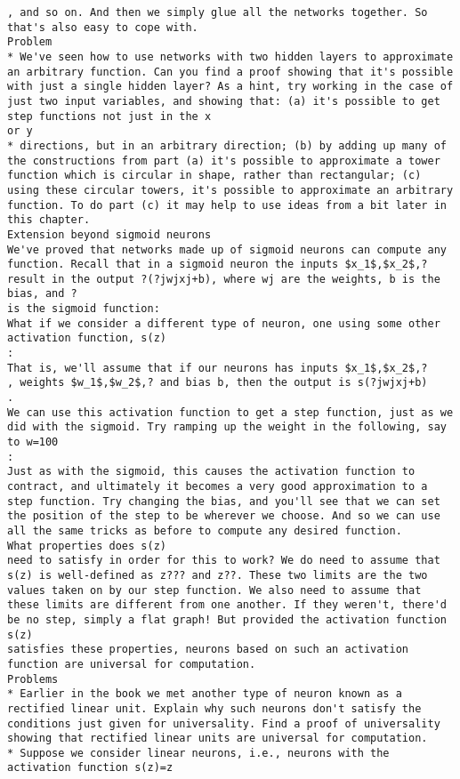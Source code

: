 \begin{lstlisting}
, and so on. And then we simply glue all the networks together. So that's also easy to cope with.
Problem
* We've seen how to use networks with two hidden layers to approximate an arbitrary function. Can you find a proof showing that it's possible with just a single hidden layer? As a hint, try working in the case of just two input variables, and showing that: (a) it's possible to get step functions not just in the x
or y
* directions, but in an arbitrary direction; (b) by adding up many of the constructions from part (a) it's possible to approximate a tower function which is circular in shape, rather than rectangular; (c) using these circular towers, it's possible to approximate an arbitrary function. To do part (c) it may help to use ideas from a bit later in this chapter.
Extension beyond sigmoid neurons
We've proved that networks made up of sigmoid neurons can compute any function. Recall that in a sigmoid neuron the inputs $x_1$,$x_2$,?
result in the output ?(?jwjxj+b), where wj are the weights, b is the bias, and ?
is the sigmoid function:
What if we consider a different type of neuron, one using some other activation function, s(z)
:
That is, we'll assume that if our neurons has inputs $x_1$,$x_2$,?
, weights $w_1$,$w_2$,? and bias b, then the output is s(?jwjxj+b)
.
We can use this activation function to get a step function, just as we did with the sigmoid. Try ramping up the weight in the following, say to w=100
:
Just as with the sigmoid, this causes the activation function to contract, and ultimately it becomes a very good approximation to a step function. Try changing the bias, and you'll see that we can set the position of the step to be wherever we choose. And so we can use all the same tricks as before to compute any desired function.
What properties does s(z)
need to satisfy in order for this to work? We do need to assume that s(z) is well-defined as z??? and z??. These two limits are the two values taken on by our step function. We also need to assume that these limits are different from one another. If they weren't, there'd be no step, simply a flat graph! But provided the activation function s(z)
satisfies these properties, neurons based on such an activation function are universal for computation.
Problems
* Earlier in the book we met another type of neuron known as a rectified linear unit. Explain why such neurons don't satisfy the conditions just given for universality. Find a proof of universality showing that rectified linear units are universal for computation.
* Suppose we consider linear neurons, i.e., neurons with the activation function s(z)=z

\end{lstlisting}

